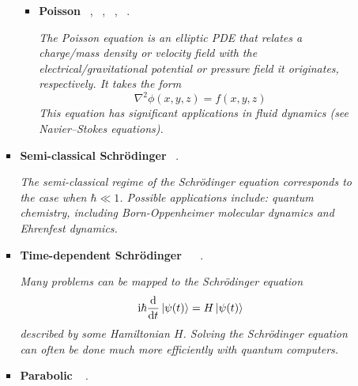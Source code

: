 \documentclass[12pt,letterpaper]{article}
\begin{document}
\begin{itemize}
\begin{itemize}
\begin{itemize}
\begin{itemize}
							\item \textbf{Poisson} ~\cite{bravo-prietoVariationalQuantumLinear2020,satoVariationalQuantumAlgorithm2021,aliPerformanceStudyVariational2022,sahaAdvancingAlgorithmScale2022,lubaschVariationalQuantumAlgorithms2020}, ~\cite{cuiOptimizationNoiseAnalysis2022},  ~\cite{caoQuantumAlgorithmCircuit2013}, ~\cite{arrazolaQuantumAlgorithmNonhomogeneous2019,ricardoAlternativesNonhomogeneousPartial2022,liuVariationalQuantumAlgorithm2021,wangQuantumFastPoisson2020}.

                          \textit{The Poisson equation is an elliptic PDE that relates a charge/mass density or velocity field with the electrical/gravitational potential or pressure field it originates, respectively. It takes the form}
                        $$ \nabla^2 \phi(x,y,z) = f(x,y,z) $$
                        \textit{This equation has significant applications in fluid dynamics (see Navier–Stokes equations).}
       
						\end{itemize}

                    \item \textbf{Semi-classical Schrödinger}  ~\cite{jinQuantumSimulationSemiclassical2022}.
                    
                    \textit{The semi-classical regime of the Schrödinger equation corresponds to the case when $\hbar \ll 1$. Possible applications include: quantum chemistry, including Born-Oppenheimer molecular dynamics and Ehrenfest dynamics.}
                    
                    \item \textbf{Time-dependent Schrödinger} ~\cite{joubert-doriolVariationalApproachLinearly2022}  ~\cite{jinQuantumSimulationSemiclassical2022}.

                    \textit{Many problems can be mapped to the Schrödinger equation $$\mathrm{i}\hbar \dv{t} \ket{\psi(t)} = H\ket{\psi(t)}$$ described by some Hamiltonian $H$. Solving the Schrödinger equation can often be done much more efficiently with quantum computers.}

                    \item \textbf{Parabolic} ~  \cite{patelQuantumInspiredTensorNeural2022}.
                    \begin{itemize} 


\end{itemize}
\end{itemize}
\end{itemize}
\end{itemize}
\end{document}
